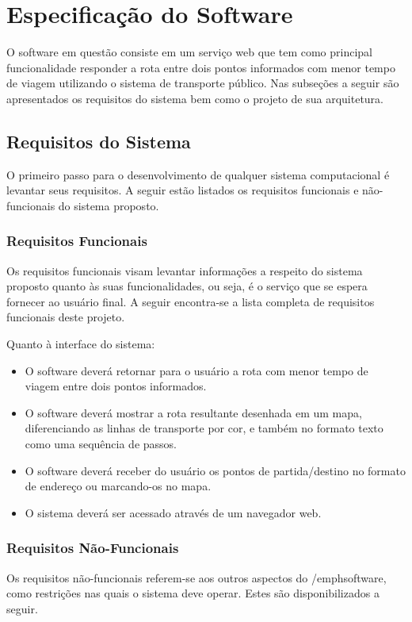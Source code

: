 
\chapter{Especificação do Software}
\label{specs}
O software em questão consiste em um serviço web que tem como principal funcionalidade responder a rota entre dois pontos informados com menor tempo de viagem utilizando o sistema de transporte público. 
Nas subseções a seguir são apresentados os requisitos do sistema bem como o projeto de sua arquitetura.

\section{Requisitos do Sistema}
O primeiro passo para o desenvolvimento de qualquer sistema computacional é levantar seus requisitos. 
A seguir estão listados os requisitos funcionais e não-funcionais do sistema proposto.

\subsection{Requisitos Funcionais}
Os requisitos funcionais visam levantar informações a respeito do sistema proposto quanto às suas funcionalidades, ou seja, é o serviço que se espera fornecer ao usuário final.
A seguir encontra-se a lista completa de requisitos funcionais deste projeto. 

Quanto à interface do sistema:
\begin{itemize}
	\item O software deverá retornar para o usuário a rota com menor tempo de viagem entre dois pontos informados.
	\item O software deverá mostrar a rota resultante desenhada em um mapa, diferenciando as linhas de transporte por cor, e também no formato texto como uma sequência de passos.
	\item O software deverá receber do usuário os pontos de partida/destino no formato de endereço ou marcando-os no mapa.
	\item O sistema deverá ser acessado através de um navegador web.
\end{itemize}

\subsection{Requisitos Não-Funcionais}
Os requisitos não-funcionais referem-se aos outros aspectos do /emph{software}, como restrições nas quais o sistema deve operar.
Estes são disponibilizados a seguir.

